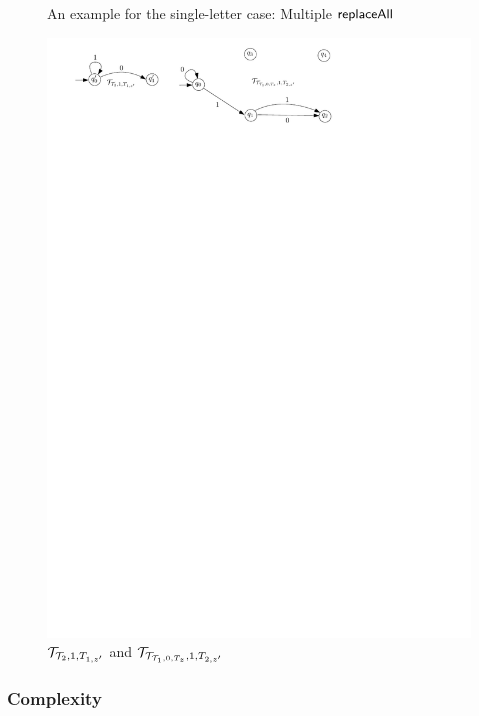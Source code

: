 \begin{example}
\begin{figure}[htbp]
\begin{center}
\end{center}
\caption{An example for the single-letter case: Multiple $\mathsf{replaceAll}$}\label{fig-sl-exmp-nested}
\end{figure}

\begin{figure}[htbp]
\begin{center}
\includegraphics[scale=0.7]{single-letter-example-nested-2.pdf}
\end{center}
\caption{$\mathcal{T}_{\mathcal{T}_2, 1, T_{1,z'}}$ and $\mathcal{T}_{\mathcal{T}_{\mathcal{T}_1, 0, T_z}, 1, T_{2,z'}}$}\label{fig-sl-exmp-nested-2}
\end{figure}
\end{example}




\subsubsection{Complexity}

